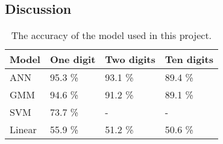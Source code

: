 \subsection*{Discussion}


\begin{table}[h]
\begin{tabular}{@{}l|lll@{}}
\toprule
Model 		   		   & One digit            & Two digits  & Ten digits   \\ \midrule
ANN                    & 95.3 \%                & 93.1 \% & 89.4 \% \\
GMM                    & 94.6 \%                & 91.2 \% & 89.1 \% \\
SVM                    & 73.7 \%                & - & - \\ 
Linear                 & 55.9 \% 				& 51.2 \% & 50.6 \%
\end{tabular}
\caption{The accuracy of the model used in this project. }
\label{table:result}
\end{table}
